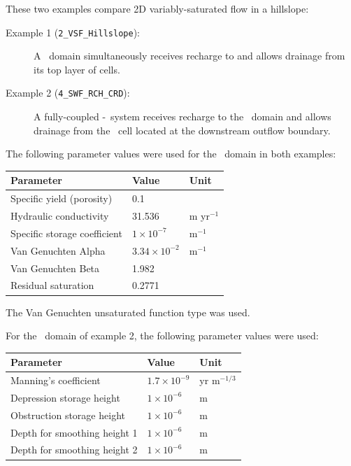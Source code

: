 \label{section:2d_hillslope_example}
These two examples compare 2D variably-saturated flow in a hillslope:
\begin{description}
    \item [Example 1 (\texttt{2\_VSF\_Hillslope}):] A \gwf\ domain  simultaneously receives recharge to and allows drainage from its top layer of cells.
    \item [Example 2 (\texttt{4\_SWF\_RCH\_CRD}):] A fully-coupled \gwf-\swf\ system receives recharge to the \swf\ domain and allows drainage from the \swf\ cell located at the downstream outflow boundary.
\end{description}

The following parameter values were used for the \gwf\ domain in both examples:

\begin{center}
    \begin{tabular}{lll}  \hline
        Parameter                             & Value & Unit                                \\ \hline
        Specific yield (porosity)             &  0.1                        &               \\
        Hydraulic conductivity                &  31.536    &   m yr$^{-1}$  \\
        Specific storage coefficient          &  $ 1 \times 10^{-7}$        &   m$^{-1}$    \\
        Van Genuchten Alpha         &  $3.34 \times 10^{-2}$                        &   m$^{-1}$    \\
        Van Genuchten Beta          &  1.982                          &               \\
        Residual saturation                   &  0.2771                        &               \\
    \hline
    \end{tabular}
\end{center}

The Van Genuchten unsaturated function type was used.

For the \swf\ domain of example 2, the following parameter values were used:

\begin{center}
    \begin{tabular}{lll}  \hline
        Parameter                           & Value                     &   Unit            \\ \hline
        Manning's coefficient               &  $1.7 \times 10^{-9}$     &   yr m$^{-1/3}$   \\
        Depression storage height           &  $1 \times 10^{-6}$       &   m               \\
        Obstruction storage height          &  $1 \times 10^{-6}$       &   m               \\
        Depth for smoothing height 1        &  $1 \times 10^{-6}$       &   m               \\
        Depth for smoothing height 2        &  $1 \times 10^{-6}$       &   m               \\
    \hline
    \end{tabular}
\end{center}

